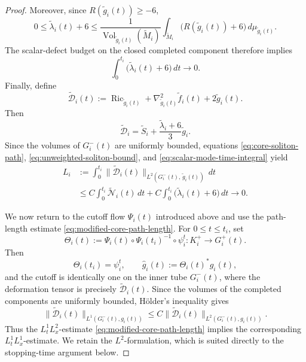 \documentclass[10pt,a4paper]{amsart}
\begin{document}
\begin{proof}
\noindent Moreover, since \(R(\widetilde g_i(t))\geq-6\),
\[
        0\leq\widetilde\lambda_i(t)+6
        \leq
        \frac{1}
        {\operatorname{Vol}_{\widetilde g_i(t)}(\widetilde M_i)}
        \int_{\widetilde M_i}
        \bigl(R(\widetilde g_i(t))+6\bigr)
        \,d\mu_{\widetilde g_i(t)}.
\]
The scalar-defect budget on the closed completed component therefore
implies
\begin{equation}
\label{eq:scalar-mode-time-integral}
        \int_0^{t_i}
        \bigl(\widetilde\lambda_i(t)+6\bigr)\,dt
        \longrightarrow0.
\end{equation}
Finally, define
\[
        \widetilde{\mathcal D}_i(t)
        :=
        \operatorname{Ric}_{\widetilde g_i(t)}
        +
        \nabla_{\widetilde g_i(t)}^2\widetilde f_i(t)
        +
        2\widetilde g_i(t).
\]
Then
\[
        \widetilde{\mathcal D}_i
        =
        \widetilde S_i
        +
        \frac{\widetilde\lambda_i+6}{3}
        \widetilde g_i.
\]
Since
the volumes of \(G_i^-(t)\) are uniformly bounded, equations
\eqref{eq:core-soliton-path},
\eqref{eq:unweighted-soliton-bound}, and
\eqref{eq:scalar-mode-time-integral} yield
\begin{equation}
\label{eq:modified-core-path-length}
\begin{aligned}
        L_i
        &:=
        \int_0^{t_i}
        \|\widetilde{\mathcal D}_i(t)\|
        _{L^2(G_i^-(t),\,\widetilde g_i(t))}
        \,dt                                                    \\
        &\leq
        C\int_0^{t_i}
        \widetilde{\mathcal N}_i(t)\,dt
        +
        C\int_0^{t_i}
        \bigl(\widetilde\lambda_i(t)+6\bigr)\,dt
        \longrightarrow0.
\end{aligned}
\end{equation}

\noindent
We now return to the cutoff flow \(\Psi_i(t)\) introduced above and
use the path-length estimate \eqref{eq:modified-core-path-length}.
For \(0\leq t\leq t_i\), set
\[
        \Theta_i(t)
        :=
        \Psi_i(t)\circ\Psi_i(t_i)^{-1}\circ\psi_i^t
        :
        K_i^+\longrightarrow G_i^+(t).
\]
Then
\[
        \Theta_i(t_i)=\psi_i^t,
        \qquad
        \widehat g_i(t):=\Theta_i(t)^*g_i(t),
\]
and the cutoff is identically one on the inner tube \(G_i^-(t)\), where
the deformation tensor is precisely
\(\widetilde{\mathcal D}_i(t)\). \noindent
Since the volumes of the completed components are uniformly bounded,
Hölder's inequality gives
\[
        \|\widetilde{\mathcal D}_i(t)\|
        _{L^1(G_i^-(t),g_i(t))}
        \leq
        C\|\widetilde{\mathcal D}_i(t)\|
        _{L^2(G_i^-(t),g_i(t))}.
\]
Thus the \(L_t^1L_x^2\)-estimate
\eqref{eq:modified-core-path-length} implies the corresponding
\(L_t^1L_x^1\)-estimate. We retain the \(L^2\)-formulation, which is
suited directly to the stopping-time argument below.


\end{proof}
\end{document}
